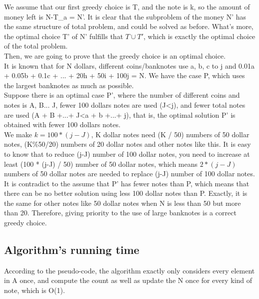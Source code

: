 \documentclass[]{article}
\begin{document}
	\noindent We assume that our first greedy choice is T, and the note is k, so the amount of money left is N-T\_{a} = N'. It is clear that the subproblem of the money N' has the same structure of total problem, and could be solved as before. What's more, the optimal choice T' of N' fulfills that $T\cup T'$, which is exactly the optimal choice of the total problem.  \\
	
	\noindent Then, we are going to prove that the greedy choice is an optimal choice.  \\
	
	\noindent It is known that for N dollars, different coins/banknotes use a, b, c to j and 0.01a + 0.05b + 0.1c + ... + 20h + 50i + 100j = N. We have the case P, which uses the largest banknotes as much as possible.   \\
	
	\noindent Suppose there is an optimal case P', where the number of different coins and notes is A, B... J, fewer 100 dollars notes are used (J\textless j), and fewer total notes are used (A + B +...+ J\textless a + b +...+ j), that is, the optimal solution P' is obtained with fewer 100 dollars notes.  \\
	
	\noindent We make $k = 100 * (j-J)$, K dollar notes need (K / 50) numbers of 50 dollar notes, (K\%50/20) numbers of 20 dollar notes and other notes like this. It is easy to know that to reduce (j-J) number of 100 dollar notes, you need to increase at least (100 * (j-J) / 50) number of 50 dollar notes, which means $2 * (j-J)$ numbers of 50 dollar notes are needed to replace (j-J) number of 100 dollar notes. It is contradict to the assume that P' has fewer notes than P, which means that there can be no better solution using less 100 dollar notes than P. Exactly, it is the same for other notes like 50 dollar notes when N is less than 50 but more than 20. Therefore, giving priority to the use of large banknotes is a correct greedy choice.
	
	\subsection{Algorithm's running time}
	
	According to the pseudo-code, the algorithm exactly only considers every element in A once, and compute the count as well as update the N once for every kind of note, which is O(1). \\
	
\end{document}
